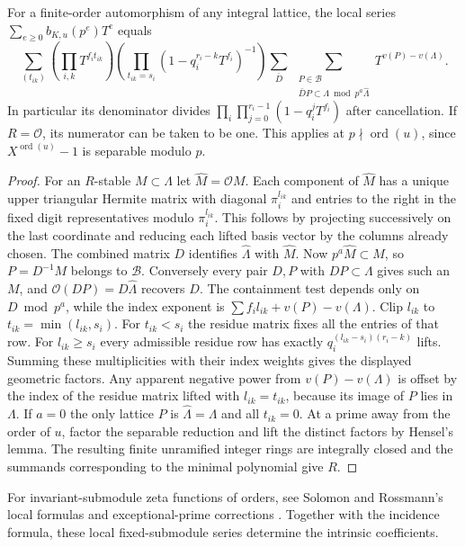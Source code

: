 \begin{theorem}\label{th:matrixlocal}
For a finite-order automorphism of any integral lattice, the local series \(\sum_{e\ge0}b_{K,u}(p^e)T^e\) equals
\[
 \sum_{(t_{ik})}
 \left(\prod_{i,k}T^{f_i t_{ik}}\right)
 \left(\prod_{t_{ik}=s_i}(1-q_i^{r_i-k}T^{f_i})^{-1}\right)
 \sum_{\bar D}\ 
 \sum_{\substack{P\in\mathcal B\\\bar D P\subset\Lambda\bmod p^a\widehat\Lambda}}
 T^{v(P)-v(\Lambda)}.
\]
In particular its denominator divides
\(\prod_i\prod_{j=0}^{r_i-1}(1-q_i^jT^{f_i})\) after cancellation. If \(R=\mathcal O\), its numerator can be taken to be one. This applies at \(p\nmid\operatorname{ord}(u)\), since \(X^{\operatorname{ord}(u)}-1\) is separable modulo \(p\).
\end{theorem}
\begin{proof}
For an \(R\)-stable \(M\subset\Lambda\) let \(\widehat M=\mathcal O M\). Each component of \(\widehat M\) has a unique upper triangular Hermite matrix with diagonal \(\pi_i^{l_{ik}}\) and entries to the right in the fixed digit representatives modulo \(\pi_i^{l_{ik}}\). This follows by projecting successively on the last coordinate and reducing each lifted basis vector by the columns already chosen. The combined matrix \(D\) identifies \(\widehat\Lambda\) with \(\widehat M\). Now \(p^a\widehat M\subset M\), so \(P=D^{-1}M\) belongs to \(\mathcal B\). Conversely every pair \(D,P\) with \(DP\subset\Lambda\) gives such an \(M\), and \(\mathcal O(DP)=D\widehat\Lambda\) recovers \(D\). The containment test depends only on \(D\bmod p^a\), while the
index exponent is \(\sum f_i l_{ik}+v(P)-v(\Lambda)\).
Clip \(l_{ik}\) to \(t_{ik}=\min(l_{ik},s_i)\). For \(t_{ik}<s_i\) the residue matrix fixes all the entries of that row. For \(l_{ik}\ge s_i\) every admissible residue row has exactly \(q_i^{(l_{ik}-s_i)(r_i-k)}\) lifts. Summing these multiplicities with their index weights gives the displayed geometric factors. Any apparent negative power from \(v(P)-v(\Lambda)\) is offset by the index of the residue matrix lifted with \(l_{ik}=t_{ik}\), because its image of \(P\) lies in \(\Lambda\). If \(a=0\) the only lattice \(P\) is \(\widehat\Lambda=\Lambda\) and all \(t_{ik}=0\). At a prime away from the order of \(u\), factor the separable reduction and lift the distinct factors by Hensel's lemma. The resulting finite unramified integer rings are integrally closed and the summands corresponding to the minimal polynomial give \(R\).
\end{proof}
For invariant-submodule zeta functions of orders, see Solomon
\cite{Solomon} and Rossmann's local formulas and exceptional-prime
corrections \cite[Thm.~A and Rem.~5.6]{Rossmann}. Together with the incidence formula, these local fixed-submodule
series determine the intrinsic coefficients.


